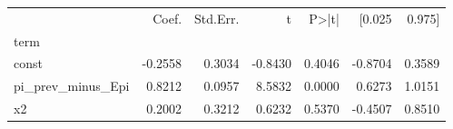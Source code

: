 \begin{tabular}{lrrrrrr}
\toprule
 & Coef. & Std.Err. & t & P>|t| & [0.025 & 0.975] \\
term &  &  &  &  &  &  \\
\midrule
const & -0.2558 & 0.3034 & -0.8430 & 0.4046 & -0.8704 & 0.3589 \\
pi_prev_minus_Epi & 0.8212 & 0.0957 & 8.5832 & 0.0000 & 0.6273 & 1.0151 \\
x2 & 0.2002 & 0.3212 & 0.6232 & 0.5370 & -0.4507 & 0.8510 \\
\bottomrule
\end{tabular}
